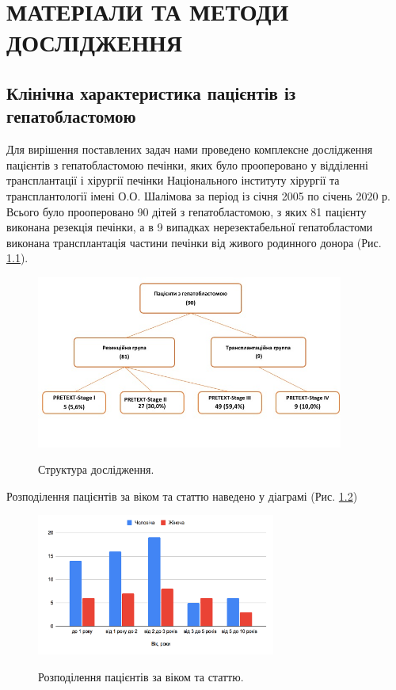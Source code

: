 \chapter{МАТЕРІАЛИ ТА МЕТОДИ ДОСЛІДЖЕННЯ}
\section{Клінічна характеристика пацієнтів із гепатобластомою}
Для вирішення поставлених задач нами проведено комплексне дослідження пацієнтів з гепатобластомою печінки, яких було прооперовано у відділенні трансплантації і хірургії печінки Національного інституту хірургії та трансплантології імені О.О. Шалімова за період із січня 2005 по січень 2020 р. Всього було прооперовано 90 дітей з гепатобластомою, з яких 81 пацієнту виконана резекція печінки, а в 9 випадках нерезектабельної гепатобластоми виконана трансплантація частини печінки від живого родинного донора (Рис. \ref{fig:90-81-9}). 

\begin{figure}[h]
\centering
\includegraphics[width=0.9\textwidth]{Illustrations/90-81-9.jpeg}
\label{fig:90-81-9} %
\caption{Структура дослідження.}
\end{figure}


Розподілення пацієнтів за віком та статтю наведено у діаграмі (Рис. \ref{fig:mw})


\begin{figure}[h]
\centering
\includegraphics[width=0.7\textwidth]{Illustrations/mw.png}
\label{fig:mw} %
\caption{Розподілення пацієнтів за віком та статтю.}
\end{figure}

